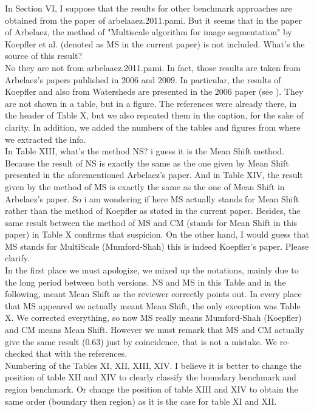\documentclass[a4paper,10pt]{report}
\begin{document}
\que In Section VI, I suppose that the results for other benchmark 
approaches are obtained from the paper of arbelaaez.2011.pami. But it 
seems that in the paper of Arbelaez, the method of "Multiscale 
algorithm for image segmentation" by Koepfler et al. (denoted as MS in 
the current paper) is not included. What's the source of this result? \\

\ans No they are not from arbelaaez.2011.pami. In fact, those results are taken from Arbelaez's papers published in 2006 and 2009.
In particular, the results of Koepfler and also from Watersheds are presented in the 2006 paper (see \cite{im_proc:segmentation:arbelaez:2006:boundary_extraction}).
They are not shown in a table, but in a figure. The references were already there, in the header of Table X, but we also repeated them in the caption, for the sake of clarity.
In addition, we added the numbers of the tables and figures from where we extracted the info.\\

\que In Table XIII, what's the method NS? i guess it is the Mean Shift 
method. Because the result of NS is exactly the same as the one given 
by Mean Shift presented in the aforementioned Arbelaez's paper. And in 
Table XIV, the result given by the method of MS is exactly the same as 
the one of Mean Shift in Arbelaez's paper. So i am wondering if here 
MS actually stands for Mean Shift rather than the method of Koepfler 
as stated in the current paper. Besides, the same result between the 
method of MS and CM (stands for Mean Shift in this paper) in Table X 
confirms that suspicion. On the other hand, I would guess that MS 
stands for MultiScale (Mumford-Shah) this is indeed Koepfler's 
paper. Please clarify. \\

\ans In the first place we must apologize, we mixed up the notations, mainly due to the long period between both versions. NS and MS in this Table and in the following, meant Mean Shift as the reviewer correctly points out.
In every place that MS appeared we actually meant Mean Shift, the only exception was Table X. We corrected everything, so now MS really means Mumford-Shah (Koepfler) and CM means Mean Shift.
However we must remark that MS and CM actually give the same result (0.63) just by coincidence, that is not a mistake. We re-checked that with the references.\\

\que Numbering of the Tables XI, XII, XIII, XIV. I believe it is better 
to change the position of table XII and XIV to clearly classify the 
boundary benchmark and region benchmark. Or change the position of 
table XIII and XIV to obtain the same order (boundary then region) as 
it is the case for table XI and XII. \\
\end{document}
